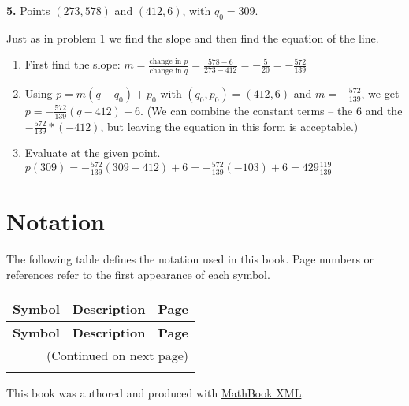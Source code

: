 \documentclass[10pt,]{book}
\theoremstyle{plain}
\theoremstyle{definition}
\begin{document}
\par\smallskip
\noindent\textbf{5.}\quad{} Points \((273,578)\) and \((412,6)\), with \(q_0=309\).
%
\par\smallskip
Just as in problem 1 we find the slope and then find the equation of the line.%
\leavevmode%
\begin{enumerate}[label=(\alph*)]
\item\hypertarget{li-12}{}First find the slope: \(m=  \frac{\text{change in }p}{\text{change in }q}
=  \frac{578-6}{273-412}=-\frac{5}{20}=-\frac{572}{139}\)%
\item\hypertarget{li-13}{}Using \(p=m (q-q_0)+p_0\) with \((q_0,p_0 )=(412, 6)\) and \(m = -\frac{572}{139}\), we get \(p=-\frac{572}{139}(q-412)+6\).  (We can combine the constant terms – the \(6\) and the \(-\frac{572}{139}*(-412)\), but leaving the equation in this form is acceptable.)%
\item\hypertarget{li-14}{}Evaluate at the given point.  \(p(309)=-\frac{572}{139}(309-412)+6
=-\frac{572}{139}(-103)+6=429\frac{119}{139}\)%
\end{enumerate}
\par\smallskip
\typeout{************************************************}
\typeout{************************************************}
\chapter[{Notation}]{Notation}\label{appendix-2}
\typeout{************************************************}
\typeout{************************************************}
The following table defines the notation used in this book. Page numbers or references refer to the first appearance of each symbol.%
\begin{longtable}[l]{lp{}r}
\textbf{Symbol}&\textbf{Description}&\textbf{Page}\\[1em]
\endfirsthead
\textbf{Symbol}&\textbf{Description}&\textbf{Page}\\[1em]
\endhead
\multicolumn{3}{r}{(Continued on next page)}\\
\endfoot
\endlastfoot
\end{longtable}
%
\backmatter
%
%
\printindex
%
\cleardoublepage
\pagestyle{empty}
\centerline{This book was authored and produced with \href{https://mathbook.pugetsound.edu}{MathBook XML}.%
}
\end{document}
